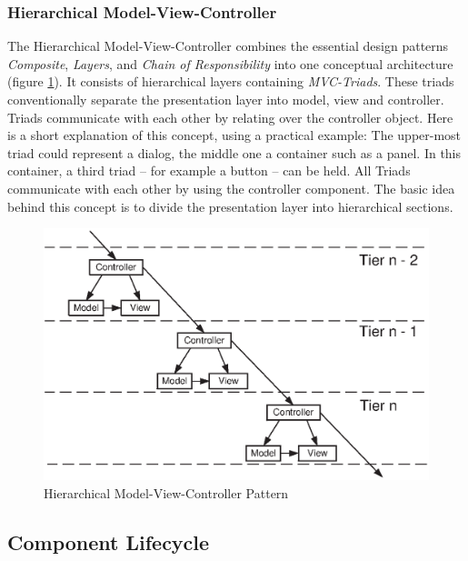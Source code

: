 \subsubsection{Hierarchical Model-View-Controller}
\label{hierarchical_model_view_controller_heading}

The Hierarchical Model-View-Controller \cite{cai} combines the essential design
patterns \emph{Composite}, \emph{Layers}, and \emph{Chain of Responsibility}
into one conceptual architecture (figure \ref{hierarchical_model_view_controller_figure}).
It consists of hierarchical layers containing \emph{MVC-Triads}. These triads
conventionally separate the presentation layer into model, view and controller.
Triads communicate with each other by relating over the controller object.
Here is a short explanation of this concept, using a practical example:
The upper-most triad could represent a dialog, the middle one a container such as
a panel. In this container, a third triad -- for example a button -- can be held.
All Triads communicate with each other by using the controller component. The
basic idea behind this concept is to divide the presentation layer into hierarchical
sections.

\begin{figure}[ht]
    \begin{center}
       \includegraphics[scale=0.5]{eps/hmvc.eps}
       \caption{Hierarchical Model-View-Controller Pattern}
       \label{hierarchical_model_view_controller_figure}
    \end{center}
\end{figure}

\subsection{Component Lifecycle}
\label{component_lifecycle_heading}

